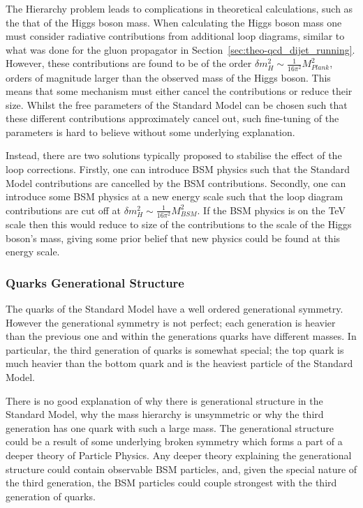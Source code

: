 The Hierarchy problem leads to complications in theoretical calculations, such as the that of the Higgs boson mass.
When calculating the Higgs boson mass one must consider
radiative contributions from additional loop diagrams,
similar to what was done for the gluon propagator in Section~\ref{sec:theo-qcd_dijet_running}.
However, these contributions are found to be of the order $\delta m_H^2 \sim \frac{1}{16\pi^2} M_{Plank}^2$\hspace{0.2mm},
orders of magnitude larger than the observed mass of the Higgs boson.
This means that some mechanism must either cancel the contributions or reduce their size.
Whilst the free parameters of the Standard Model can be chosen such that these different contributions approximately cancel out,
such fine-tuning of the parameters is hard to believe without some underlying explanation.

Instead, there are two solutions typically proposed to stabilise the effect of the loop corrections.
Firstly, one can introduce BSM physics such that the Standard Model contributions are cancelled by the BSM contributions.
Secondly, one can introduce some BSM physics at a new energy scale
such that the loop diagram contributions are cut off at $\delta m_H^2 \sim \frac{1}{16\pi^2} M_{BSM}^2$.
If the BSM physics is on the TeV scale then this would reduce to size of the contributions to the scale of the Higgs boson's mass,
giving some prior belief that new physics could be found at this energy scale.

\subsubsection{Quarks Generational Structure}
\label{sec:theo-bsm_3g}

The quarks of the Standard Model have a well ordered generational symmetry.
However the generational symmetry is not perfect;
each generation is heavier than the previous one
and within the generations quarks have different masses.
In particular, the third generation of quarks is somewhat special;
the top quark is much heavier than the bottom quark
and is the heaviest particle of the Standard Model.

There is no good explanation of why there is generational structure in the Standard Model,
why the mass hierarchy is unsymmetric 
or why the third generation has one quark with such a large mass.
The generational structure could be a result of some underlying broken symmetry
which forms a part of a deeper theory of Particle Physics.
Any deeper theory explaining the generational structure could contain observable BSM particles,
and, given the special nature of the third generation,
the BSM particles could couple strongest with the third generation of quarks.

